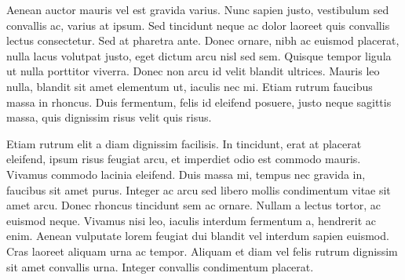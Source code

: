 Aenean auctor mauris vel est gravida varius. Nunc sapien justo, vestibulum sed convallis ac, varius at ipsum. Sed tincidunt neque ac dolor laoreet quis convallis lectus consectetur. Sed at pharetra ante. Donec ornare, nibh ac euismod placerat, nulla lacus volutpat justo, eget dictum arcu nisl sed sem. Quisque tempor ligula ut nulla porttitor viverra. Donec non arcu id velit blandit ultrices. Mauris leo nulla, blandit sit amet elementum ut, iaculis nec mi. Etiam rutrum faucibus massa in rhoncus. Duis fermentum, felis id eleifend posuere, justo neque sagittis massa, quis dignissim risus velit quis risus.

Etiam rutrum elit a diam dignissim facilisis. In tincidunt, erat at placerat eleifend, ipsum risus feugiat arcu, et imperdiet odio est commodo mauris. Vivamus commodo lacinia eleifend. Duis massa mi, tempus nec gravida in, faucibus sit amet purus. Integer ac arcu sed libero mollis condimentum vitae sit amet arcu. Donec rhoncus tincidunt sem ac ornare. Nullam a lectus tortor, ac euismod neque. Vivamus nisi leo, iaculis interdum fermentum a, hendrerit ac enim. Aenean vulputate lorem feugiat dui blandit vel interdum sapien euismod. Cras laoreet aliquam urna ac tempor. Aliquam et diam vel felis rutrum dignissim sit amet convallis urna. Integer convallis condimentum placerat. 
